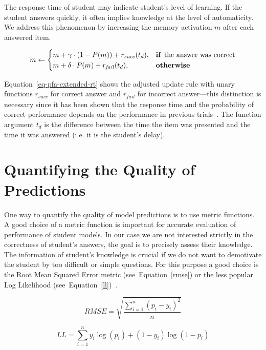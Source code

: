 The response time of student may indicate student's level of learning. If the student answers quickly, it often implies knowledge at the level of automaticity. We address this phenomenon by increasing the memory activation $m$ after each answered item.

\begin{equation} \label{eq-pfa-extended-rt}
  m \gets \begin{cases}
            m + \gamma \cdot (1 - P(m)) + r_{\mathit{succ}}(t_d), & \text{\textbf{if }} \text{the answer was correct} \\
            m + \delta \cdot P(m) + r_{\mathit{fail}}(t_d), & \text{\textbf{otherwise}}
          \end{cases}
\end{equation}

Equation~\ref{eq-pfa-extended-rt} shows the adjusted update rule with unary functions $r_{\mathit{succ}}$ for correct answer and $r_{\mathit{fail}}$ for incorrect answer---this distinction is necessary since it has been shown that the response time and the probability of correct performance depends on the performance in previous trials~\cite{papouvsekanalysis}. The function argument $t_d$ is the difference between the time the item was presented and the time it was answered (i.e. it is the student's delay).

\section{Quantifying the Quality of Predictions}
\label{metrics}

One way to quantify the quality of model predictions is to use metric functions. A good choice of a metric function is important for accurate evaluation of performance of student models. In our case we are not interested strictly in the correctness of student's answers, the goal is to precisely assess their knowledge. The information of student's knowledge is crucial if we do not want to demotivate the student by too difficult or simple questions. For this purpose a good choice is the Root Mean Squared Error metric (see~Equation~\ref{rmse}) or the less popular Log Likelihood (see~Equation~\ref{ll})~\cite{Pelanek2015a}.

\begin{equation} \label{rmse}
  RMSE = \sqrt{\frac{\sum_{i=1}^n (p_i - y_i)^2}{n}}
\end{equation}

\begin{equation} \label{ll}
  LL = \sum_{i=1}^n y_i \log(p_i) + (1 - y_i) \log(1 - p_i)
\end{equation}

